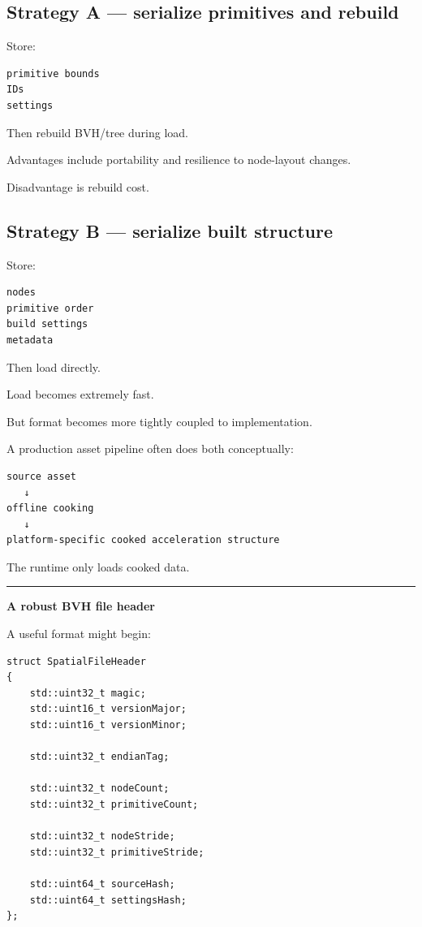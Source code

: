\subsection{Strategy A --- serialize primitives and rebuild}\label{06-engine-ii-ch031-strategy-a-serialize-primitives-and-rebuild}

\hypertarget{06-engine-ii-ch031-strategy-a-serialize-primitives-and-rebuild}{}

Store:

\begin{verbatim}
primitive bounds
IDs
settings
\end{verbatim}

Then rebuild BVH/tree during load.

Advantages include portability and resilience to node-layout changes.

Disadvantage is rebuild cost.

\subsection{Strategy B --- serialize built structure}\label{06-engine-ii-ch031-strategy-b-serialize-built-structure}

\hypertarget{06-engine-ii-ch031-strategy-b-serialize-built-structure}{}

Store:

\begin{verbatim}
nodes
primitive order
build settings
metadata
\end{verbatim}

Then load directly.

Load becomes extremely fast.

But format becomes more tightly coupled to implementation.

A production asset pipeline often does both conceptually:

\begin{verbatim}
source asset
   ↓
offline cooking
   ↓
platform-specific cooked acceleration structure
\end{verbatim}

The runtime only loads cooked data.

\begin{center}\rule{0.5\linewidth}{0.5pt}\end{center}

\textbf{A robust BVH file header}

A useful format might begin:

\begin{verbatim}
struct SpatialFileHeader
{
    std::uint32_t magic;
    std::uint16_t versionMajor;
    std::uint16_t versionMinor;

    std::uint32_t endianTag;

    std::uint32_t nodeCount;
    std::uint32_t primitiveCount;

    std::uint32_t nodeStride;
    std::uint32_t primitiveStride;

    std::uint64_t sourceHash;
    std::uint64_t settingsHash;
};
\end{verbatim}

